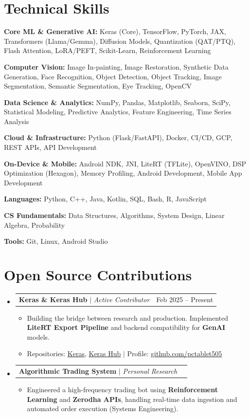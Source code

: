 \documentclass[10pt, letterpaper]{article}
\makeatletter
\newcommand{\resumeItem}[1]{
  \item\small{
    {#1 \vspace{-2pt}}
  }
}
\newcommand{\resumeProjectHeading}[2]{
    \item
    \begin{tabular*}{0.98\textwidth}{l@{\extracolsep{\fill}}r}
      \small#1 & #2 \\
    \end{tabular*}\vspace{-7pt}
}
\newcommand{\resumeSubHeadingListStart}{\begin{itemize}[leftmargin=0.15in, label={}]}
\newcommand{\resumeSubHeadingListEnd}{\end{itemize}}
\newcommand{\resumeItemListStart}{\begin{itemize}}
\newcommand{\resumeItemListEnd}{\end{itemize}\vspace{-5pt}}
\makeatother
\begin{document}
\section{Technical Skills}
 \begin{itemize}[leftmargin=0.12in, label={}]
    \small{\item{
     \textbf{Core ML \& Generative AI:} Keras (Core), TensorFlow, PyTorch, JAX, Transformers (Llama/Gemma), Diffusion Models, Quantization (QAT/PTQ), Flash Attention, LoRA/PEFT, Scikit-Learn, Reinforcement Learning
    }}
    \small{\item{
     \textbf{Computer Vision:} Image In-painting, Image Restoration, Synthetic Data Generation, Face Recognition, Object Detection, Object Tracking, Image Segmentation, Semantic Segmentation, Eye Tracking, OpenCV
    }}
    \small{\item{
     \textbf{Data Science \& Analytics:} NumPy, Pandas, Matplotlib, Seaborn, SciPy, Statistical Modeling, Predictive Analytics, Feature Engineering, Time Series Analysis
    }}
    \small{\item{
     \textbf{Cloud \& Infrastructure:} Python (Flask/FastAPI), Docker, CI/CD, GCP, REST APIs, API Development
    }}
    \small{\item{
     \textbf{On-Device \& Mobile:} Android NDK, JNI, LiteRT (TFLite), OpenVINO, DSP Optimization (Hexagon), Memory Profiling, Android Development, Mobile App Development
    }}
    \small{\item{
     \textbf{Languages:} Python, C++, Java, Kotlin, SQL, Bash, R, JavaScript
    }}
    \small{\item{
     \textbf{CS Fundamentals:} Data Structures, Algorithms, System Design, Linear Algebra, Probability
    }}
    \small{\item{
     \textbf{Tools:} Git, Linux, Android Studio
    }}
 \end{itemize}

\section{Open Source Contributions}
  \resumeSubHeadingListStart
    \resumeProjectHeading
      {\textbf{Keras \& Keras Hub} $|$ \emph{Active Contributor}}{Feb 2025 -- Present}
      \resumeItemListStart
        \resumeItem{Building the bridge between research and production. Implemented \textbf{LiteRT Export Pipeline} and backend compatibility for \textbf{GenAI} models.}
        \resumeItem{Repositories: \href{https://github.com/keras-team/keras}{Keras}, \href{https://github.com/keras-team/keras-hub}{Keras Hub} $|$ Profile: \href{https://github.com/pctablet505}{\color{midnightblue}github.com/pctablet505}}
      \resumeItemListEnd

    \resumeProjectHeading
      {\textbf{Algorithmic Trading System} $|$ \emph{Personal Research}}{}
      \resumeItemListStart
        \resumeItem{Engineered a high-frequency trading bot using \textbf{Reinforcement Learning} and \textbf{Zerodha APIs}, handling real-time data ingestion and automated order execution (Systems Engineering).}
      \resumeItemListEnd
      
  \resumeSubHeadingListEnd
\end{document}
